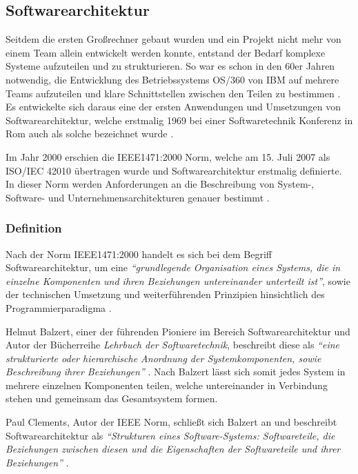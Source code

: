 \subsection{Softwarearchitektur}

Seitdem die ersten Großrechner gebaut wurden und ein Projekt nicht mehr von einem Team allein entwickelt werden konnte, entstand der Bedarf komplexe Systeme aufzuteilen und zu strukturieren. So war es schon in den 60er Jahren notwendig, die Entwicklung des Betriebssystems OS/360 von IBM auf mehrere Teams aufzuteilen und klare Schnittstellen zwischen den Teilen zu bestimmen \parencite{brooks_mythical_1995}. Es entwickelte sich daraus eine der ersten Anwendungen und Umsetzungen von Softwarearchitektur, welche erstmalig 1969 bei einer Softwaretechnik Konferenz in Rom auch als solche bezeichnet wurde \parencite[vgl.][S. 12]{buxton_software_1970}.

Im Jahr 2000 erschien die IEEE1471:2000 Norm, welche am 15. Juli 2007 als ISO/IEC 42010 übertragen wurde und Softwarearchitektur erstmalig definierte. In dieser Norm werden Anforderungen an die Beschreibung von System-, Software- und Unternehmensarchitekturen genauer bestimmt \parencite{hilliard_isoiecieee_nodate}.

\subsubsection{Definition}
\label{sec:software-architect-definition}

Nach der Norm IEEE1471:2000 handelt es sich bei dem Begriff Softwarearchitektur, um eine  \textit{\enquote{grundlegende Organisation eines Systems, die in einzelne Komponenten und ihren Beziehungen untereinander unterteilt ist}}, sowie der technischen Umsetzung und weiterführenden Prinzipien hinsichtlich des Programmierparadigma \parencite[][S. 12]{clements_comparing_2005}.

Helmut Balzert, einer der führenden Pioniere im Bereich Softwarearchitektur und Autor der Bücherreihe \textit{Lehrbuch der Softwaretechnik}, beschreibt diese als \textit{\enquote{eine strukturierte oder hierarchische Anordnung der Systemkomponenten, sowie Beschreibung ihrer Beziehungen}} \parencite[][S. 580]{balzert_lehrbuch_2011}. Nach Balzert lässt sich somit jedes System in mehrere einzelnen Komponenten teilen, welche untereinander in Verbindung stehen und gemeinsam das Gesamtsystem formen.

Paul Clements, Autor der IEEE Norm, schließt sich Balzert an und beschreibt Softwarearchitektur als \textit{\enquote{Strukturen eines Software-Systems: Softwareteile, die Beziehungen zwischen diesen und die Eigenschaften der Softwareteile und ihrer Beziehungen}} \parencite[][S. 23]{clements_documenting_2010}.

